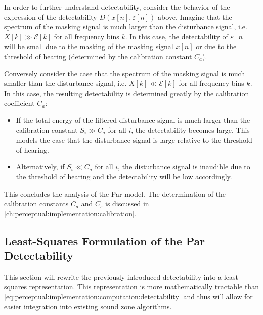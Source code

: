 In order to further understand detectability, consider the behavior of the expression of the detectability $D(x[n],\varepsilon[n])$ above.
Imagine that the spectrum of the masking signal is much larger than the disturbance signal, 
i.e. $X[k] \gg \mathcal{E}[k]$ for all frequency bins $k$.
In this case, the detectability of $\varepsilon[n]$ will be small due to the masking of the masking signal $x[n]$ or
due to the threshold of hearing (determined by the calibration constant $C_a$).

Conversely consider the case that the spectrum of the masking signal is much smaller than the disturbance signal,
i.e. $X[k] \ll \mathcal{E}[k]$ for all frequency bins $k$.
In this case, the resulting detectability is determined greatly by the calibration coefficient $C_a$: 
\begin{itemize}
    \item If the total energy of the filtered disturbance signal is much larger than the calibration constant 
$S_i \gg C_a$ for all $i$, the detectability becomes large.
This models the case that the disturbance signal is large relative to the threshold of hearing.
    \item Alternatively, if $S_i \ll C_a$ for all $i$, the disturbance signal is inaudible due to the threshold of hearing and 
the detectability will be low accordingly.
\end{itemize}

This concludes the analysis of the Par model.
The determination of the calibration constants $C_a$ and $C_s$ is discussed in \autoref{ch:perceptual:implementation:calibration}.


\subsection{Least-Squares Formulation of the Par Detectability}
\label{ch:perceptual:implementation:least_squares}
This section will rewrite the previously introduced detectability into a least-squares representation. 
This representation is more mathematically tractable than \autoref{eq:perceptual:implementation:computation:detectability} and thus 
will allow for easier integration into existing sound zone algorithms.

